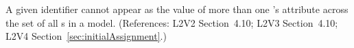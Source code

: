 A given identifier cannot appear as the value of more than one
\InitialAssignment{}'s  attribute across
the set of all \InitialAssignment{}s in a model.  (References:
L2V2 Section~4.10; L2V3
Section~4.10; L2V4 Section~\ref{sec:initialAssignment}.)
